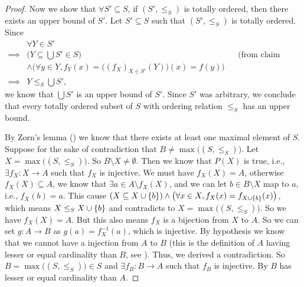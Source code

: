 \begin{proof}
  Now we show that \(\forall S' \subseteq S\), if \((S', \leq_S)\) is totally ordered, then there exists an upper bound of \(S'\).
  Let \(S' \subseteq S\) such that \((S', \leq_S)\) is totally ordered.
  Since
  \begin{align*}
             & \forall Y \in S'                                                                                                 \\
    \implies & \Big(Y \subseteq \bigcup S' \in S\Big)                                            &  & \text{(from claim above)} \\
             & \land \Big(\forall y \in Y, f_Y(x) = \big((f_X)_{X \in S'}(Y)\big)(x) = f(y)\Big)                                \\
    \implies & Y \leq_S \bigcup S',
  \end{align*}
  we know that \(\bigcup S'\) is an upper bound of \(S'\).
  Since \(S'\) was arbitrary, we conclude that every totally ordered subset of \(S\) with ordering relation \(\leq_S\) has an upper bound.

  By Zorn's lemma () we know that there exists at least one maximal element of \(S\).
  Suppose for the sake of contradiction that \(B \neq \max\big((S, \leq_S)\big)\).
  Let \(X = \max\big((S, \leq_S)\big)\).
  So \(B \setminus X \neq \emptyset\).
  Then we know that \(P(X)\) is true, i.e., \(\exists f_X : X \to A\) such that \(f_X\) is injective.
  We must have \(f_X(X) = A\), otherwise \(f_X(X) \subseteq A\), we know that \(\exists a \in A \setminus f_X(X)\), and we can let \(b \in B \setminus X\) map to \(a\), i.e., \(f_X(b) = a\).
  This cause \((X \subseteq X \cup \left\lbrace b\right\rbrace) \land \big(\forall x \in X, f_X(x) = f_{X \cup \left\lbrace b\right\rbrace}(x)\big)\), which means \(X \leq_S X \cup \left\lbrace b\right\rbrace\) and contradicts to \(X = \max\big((S, \leq_S)\big)\).
  So we have \(f_X(X) = A\).
  But this also means \(f_X\) is a bijection from \(X\) to \(A\).
  So we can set \(g : A \to B\) as \(g(a) = f_X^{-1}(a)\), which is injective.
  By hypothesis we know that we cannot have a injection from \(A\) to \(B\) (this is the definition of \(A\) having lesser or equal cardinality than \(B\), see ).
  Thus, we derived a contradiction.
  So \(B = \max\big((S, \leq_S)\big) \in S\) and \(\exists f_B : B \to A\) such that \(f_B\) is injective.
  By  \(B\) has lesser or equal cardinality than \(A\).
\end{proof}


